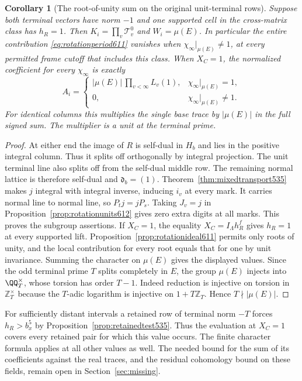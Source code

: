 \documentclass[a4paper,11pt]{article}
\newtheorem{corollary}[proposition]{Corollary}
\theoremstyle{definition}
\theoremstyle{remark}
\newcommand{\ZZ}{\mathbb Z}\newcommand{\ord}{\operatorname{ord}}
\numberwithin{equation}{section}
\begin{document}
\begin{corollary}[The root-of-unity sum on the original unit-terminal rows]
\leavevmode\label{cor:rotationroots612}
Suppose both terminal vectors have norm \(-1\) and one supported
cell in the cross-matrix class has \(h_R=1\). Then
\(K_i=\prod_v\mathcal T_v^0\) and \(W_i=\mu(E)\). In particular
the entire contribution \eqref{eq:rotationperiod611} vanishes
when \(\chi_\infty|_{\mu(E)}\ne1\), at every permitted frame
cutoff that includes this class. When \(X_C=1\), the normalized
coefficient for every \(\chi_\infty\) is exactly
\[
 A_i=
 \begin{cases}
 |\mu(E)|\,\displaystyle\prod_{v<\infty}L_v(1),
                     &\chi_\infty|_{\mu(E)}=1,\\
 0,                  &\chi_\infty|_{\mu(E)}\ne1 .
 \end{cases}
\]
For identical columns this multiplies the single base trace by
\(|\mu(E)|\) in the full signed sum. The multiplier is a unit at
the terminal prime.
\end{corollary}
\begin{proof}
At either end the image of \(R\) is self-dual in \(H_b\) and
lies in the positive integral column. Thus it splits off
orthogonally by integral projection. The unit terminal line
also splits off from the self-dual middle row. The remaining
normal lattice is therefore self-dual and \(\mathfrak d_b=(1)\).
Theorem~\ref{thm:mixedtransport535} makes \(j\) integral with
integral inverse, inducing \(i_v\) at every mark. It carries
normal line to normal line, so \(P_tj=jP_s\). Taking \(J_v=j\)
in Proposition~\ref{prop:rotationunits612} gives zero extra digits
at all marks. This proves the subgroup assertions. If \(X_C=1\),
the equality \(X_C=I_\Lambda h_R^f\) gives \(h_R=1\) at every
supported lift. Proposition~\ref{prop:rotationideal611} permits
only roots of unity, and the local contribution for every root
equals that for one by unit invariance. Summing the character on
\(\mu(E)\) gives the displayed values. Since the odd terminal prime
\(T\) splits completely in \(E\), the group \(\mu(E)\) injects
into \(\QQ_T^\times\), whose torsion has order \(T-1\). Indeed
reduction is injective on torsion in \(\ZZ_T^\times\) because the
\(T\)-adic logarithm is injective on \(1+T\ZZ_T\). Hence
\(T\nmid|\mu(E)|\).
\end{proof}

For sufficiently distant intervals a retained row of terminal
norm \(-T\) forces \(h_R>b_x^5\) by
Proposition~\ref{prop:retainedtest535}. Thus the evaluation at
\(X_C=1\) covers every retained pair for which this value occurs.
The finite character formula applies at all other values as well.
The needed bound for the sum of its coefficients against the real
traces, and the residual cohomology bound on these fields, remain
open in Section~\ref{sec:missing}.
\end{document}
